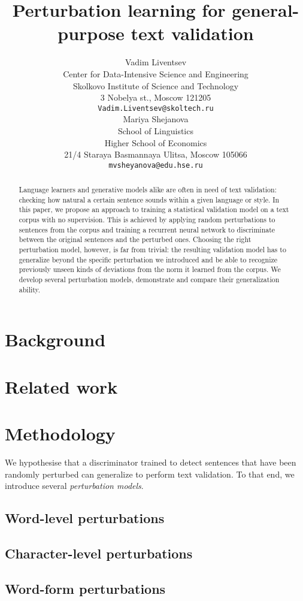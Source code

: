 \documentclass[11pt,a4paper]{article}
\title{Perturbation learning for general-purpose text validation}
\author{Vadim Liventsev \\
  Center for Data-Intensive Science and Engineering \\
  Skolkovo Institute of Science and Technology\\
  3 Nobelya st., Moscow 121205 \\
  {\tt Vadim.Liventsev@skoltech.ru} \\\And
  Mariya Shejanova \\
  School of Linguistics \\
  Higher School of Economics \\
  21/4 Staraya Basmannaya Ulitsa, Moscow 105066 \\
  {\tt mvsheyanova@edu.hse.ru} \\}
\date{}
\begin{document}
\maketitle
\begin{abstract}
  Language learners and generative models alike are often in need of text validation: checking how natural a certain sentence sounds within a given language or style.
  In this paper, we propose an approach to training a statistical validation model on a text corpus with no supervision.
  This is achieved by applying random perturbations to sentences from the corpus and training a recurrent neural network to discriminate between the original sentences and the perturbed ones.
  Choosing the right perturbation model, however, is far from trivial: the resulting validation model has to generalize beyond the specific perturbation we introduced and be able to recognize previously unseen kinds of deviations from the norm it learned from the corpus.
  We develop several perturbation models, demonstrate and compare their generalization ability.
\end{abstract}\section{Background}
\label{sec:background}

\section{Related work}
\label{sec:related-work}

\section{Methodology}
\label{sec:methodology}

We hypothesise that a discriminator trained to detect sentences that have been randomly perturbed can generalize to perform text validation. To that end, we introduce several \emph{perturbation models}.

\subsection{Word-level perturbations}

\subsection{Character-level perturbations}

\subsection{Word-form perturbations}
\end{document}
